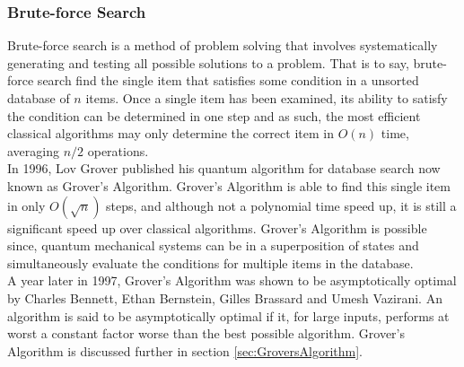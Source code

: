 \documentclass[reqno]{amsart}
\numberwithin{equation}{section}
\numberwithin{figure}{section}
\begin{document}
\subsubsection{Brute-force Search}
\begin{justify}
Brute-force search is a method of problem solving that involves systematically generating and testing all possible solutions to a problem. That is to say, brute-force search find the single item that satisfies some condition in a unsorted database of $n$ items. Once a single item has been examined, its ability to satisfy the condition can be determined in one step and as such, the most efficient classical algorithms may only determine the correct item in $O(n)$ time, averaging $n/2$ operations. \\

In 1996, Lov Grover published his quantum algorithm for database search \cite{Grover1996} now known as Grover's Algorithm. Grover's Algorithm is able to find this single item in only $O(\sqrt{n})$ steps, and although not a polynomial time speed up, it is still a significant speed up over classical algorithms. Grover's Algorithm is possible since, quantum mechanical systems can be in a superposition of states and simultaneously evaluate the conditions for multiple items in the database. \\

A year later in 1997, Grover's Algorithm was shown to be asymptotically optimal by Charles Bennett, Ethan Bernstein, Gilles Brassard and Umesh Vazirani. \cite{BennettBernsteinBrassardVazirani1997} An algorithm is said to be asymptotically optimal if it, for large inputs, performs at worst a constant factor worse than the best possible algorithm.  Grover's Algorithm is discussed further in section \ref{sec:GroversAlgorithm}.
\end{justify}
\end{document}
